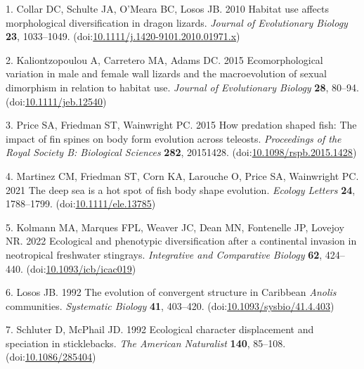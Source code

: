 \documentclass[
  11pt,
]{article}
\begin{document}
\setlength{\parindent}{-0.25in} \setlength{\leftskip}{0.25in}
\setlength{\parskip}{8pt} \noindent

\hypertarget{refs}{}
\leavevmode\hypertarget{ref-COLLAR2010}{}%
1. Collar DC, Schulte JA, O'Meara BC, Losos JB. 2010 Habitat use affects
morphological diversification in dragon lizards. \emph{Journal of
Evolutionary Biology} \textbf{23}, 1033--1049.
(doi:\href{https://doi.org/10.1111/j.1420-9101.2010.01971.x}{10.1111/j.1420-9101.2010.01971.x})

\leavevmode\hypertarget{ref-Kaliontzopoulou2015}{}%
2. Kaliontzopoulou A, Carretero MA, Adams DC. 2015 Ecomorphological
variation in male and female wall lizards and the macroevolution of
sexual dimorphism in relation to habitat use. \emph{Journal of
Evolutionary Biology} \textbf{28}, 80--94.
(doi:\href{https://doi.org/10.1111/jeb.12540}{10.1111/jeb.12540})

\leavevmode\hypertarget{ref-Price2015}{}%
3. Price SA, Friedman ST, Wainwright PC. 2015 How predation shaped fish:
The impact of fin spines on body form evolution across teleosts.
\emph{Proceedings of the Royal Society B: Biological Sciences}
\textbf{282}, 20151428.
(doi:\href{https://doi.org/10.1098/rspb.2015.1428}{10.1098/rspb.2015.1428})

\leavevmode\hypertarget{ref-Martinez2021}{}%
4. Martinez CM, Friedman ST, Corn KA, Larouche O, Price SA, Wainwright
PC. 2021 The deep sea is a hot spot of fish body shape evolution.
\emph{Ecology Letters} \textbf{24}, 1788--1799.
(doi:\href{https://doi.org/10.1111/ele.13785}{10.1111/ele.13785})

\leavevmode\hypertarget{ref-Kolmann2022}{}%
5. Kolmann MA, Marques FPL, Weaver JC, Dean MN, Fontenelle JP, Lovejoy
NR. 2022 Ecological and phenotypic diversification after a continental
invasion in neotropical freshwater stingrays. \emph{Integrative and
Comparative Biology} \textbf{62}, 424--440.
(doi:\href{https://doi.org/10.1093/icb/icac019}{10.1093/icb/icac019})

\leavevmode\hypertarget{ref-Losos1992}{}%
6. Losos JB. 1992 The evolution of convergent structure in Caribbean
\emph{Anolis} communities. \emph{Systematic Biology} \textbf{41},
403--420.
(doi:\href{https://doi.org/10.1093/sysbio/41.4.403}{10.1093/sysbio/41.4.403})

\leavevmode\hypertarget{ref-Schluter1992}{}%
7. Schluter D, McPhail JD. 1992 Ecological character displacement and
speciation in sticklebacks. \emph{The American Naturalist} \textbf{140},
85--108. (doi:\href{https://doi.org/10.1086/285404}{10.1086/285404})
\end{document}
